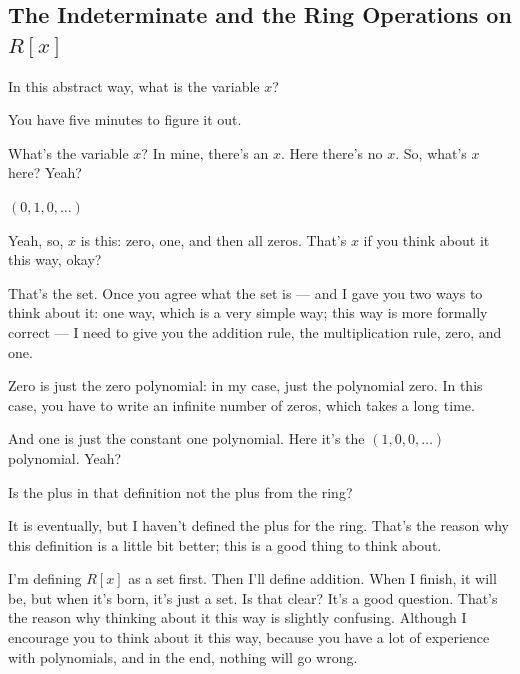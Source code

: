 \subsection{The Indeterminate and the Ring Operations on \texorpdfstring{$R[x]$}{R[x]}}

\begin{speech}[01:23:58 - 01:24:24]
In this abstract way, what is the variable $x$? 

You have five minutes to figure it out.

What's the variable $x$? In mine, there's an $x$. Here there's no $x$. So, what's $x$ here? Yeah?
\end{speech}

\begin{student}
$(0, 1, 0, \dots)$
\end{student}

\begin{speech}[01:24:27 - 01:25:20]
Yeah, so, $x$ is this:  zero, one, and then all zeros. That's $x$ if you think about it this way, okay?

That's the set. Once you agree what the set is --- and I gave you two ways to think about it: one way, which is a very simple way; this way is more formally correct --- I need to give you the addition rule, the multiplication rule, zero, and one. 

Zero is just the zero polynomial: in my case, just the polynomial zero. In this case, you have to write an infinite number of zeros, which takes a long time. 

And one is just the constant one polynomial. Here it's the $(1, 0, 0, \dots)$ polynomial.  Yeah?
\end{speech}

\begin{student}
Is the plus in that definition not the plus from the ring?
\end{student}

\begin{speech}[01:25:25 - 01:26:05]
It is eventually, but I haven't defined the plus for the ring. That's the reason why this definition is a little bit better; this is a good thing to think about.

I'm defining $R[x]$ as a set first. Then I'll define addition. When I finish, it will be, but when it's born, it's just a set. Is that clear?
It's a good question. That's the reason why thinking about it this way is slightly confusing. Although I encourage you to think about it this way, because you have a lot of experience with polynomials, and in the end, nothing will go wrong.
\end{speech}


